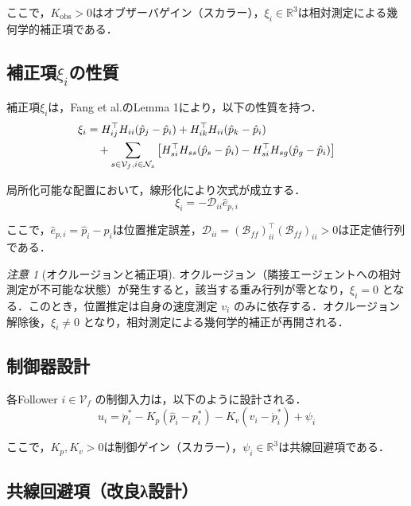 \documentclass[a4paper]{jarticle}
\theoremstyle{definition}
\theoremstyle{remark}
\newtheorem{remark}{注意}[section]
\numberwithin{equation}{section}
\begin{document}
	ここで，$K_{\mathrm{obs}} > 0$はオブザーバゲイン（スカラー），$\xi_i \in \mathbb{R}^3$は相対測定による幾何学的補正項である．
	
	\subsection{補正項$\xi_i$の性質}
	
	補正項$\xi_i$は，Fang et al.\cite{SD}のLemma 1により，以下の性質を持つ．
	\begin{align}
		\xi_i &= H_{ij}^\top H_{ii}(\hat{p}_j - \hat{p}_i) + H_{ik}^\top H_{ii}(\hat{p}_k - \hat{p}_i) \notag\\
		&\quad + \sum_{s \in \mathcal{V}_f, i \in \mathcal{N}_s} \left[ H_{si}^\top H_{ss}(\hat{p}_s - \hat{p}_i) - H_{si}^\top H_{sg}(\hat{p}_g - \hat{p}_i) \right]
		\label{eq:xi_exact}
	\end{align}
	
	局所化可能な配置において，線形化により次式が成立する．
	\begin{equation}
		\xi_i = -\mathcal{D}_{ii} \hat{e}_{p,i}
		\label{eq:xi_linear}
	\end{equation}
	
	ここで，$\hat{e}_{p,i} = \hat{p}_i - p_i$は位置推定誤差，$\mathcal{D}_{ii} = (\mathcal{B}_{ff})_{ii}^\top (\mathcal{B}_{ff})_{ii} > 0$は正定値行列である．
	
	\begin{remark}[オクルージョンと補正項]
		オクルージョン（隣接エージェントへの相対測定が不可能な状態）が発生すると，該当する重み行列が零となり，$\xi_i = 0$ となる．このとき，位置推定は自身の速度測定 $v_i$ のみに依存する．オクルージョン解除後，$\xi_i \neq 0$ となり，相対測定による幾何学的補正が再開される．
	\end{remark}
	
	\subsection{制御器設計}
	
	各Follower $i \in \mathcal{V}_f$ の制御入力は，以下のように設計される．
	\begin{equation}
		u_i = \ddot{p}_i^* - K_p(\hat{p}_i - p_i^*) - K_v(v_i - \dot{p}_i^*) + \psi_i
		\label{eq:controller}
	\end{equation}
	
	ここで，$K_p, K_v > 0$は制御ゲイン（スカラー），$\psi_i \in \mathbb{R}^3$は共線回避項である．
	
	\subsection{共線回避項（改良λ設計）}
	
\end{document}
